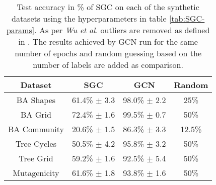 \begin{table}
    \centering
    \begin{tabular}{c|c|cc}
        \textbf{Dataset} & \textbf{SGC} & \textbf{GCN} & \textbf{Random} \\
        \midrule
        BA Shapes       & 61.4\% $\pm$ 3.3 & 98.0\% $\pm$ 2.2 & 25\% \\
        BA Grid         & 72.4\% $\pm$ 1.6 & 99.5\% $\pm$ 0.7 & 50\% \\
        BA Community    & 20.6\% $\pm$ 1.5 & 86.3\% $\pm$ 3.3 & 12.5\% \\
        Tree Cycles     & 50.5\% $\pm$ 4.2 & 95.8\% $\pm$ 3.2 & 50\% \\
        Tree Grid       & 59.2\% $\pm$ 1.6 & 92.5\% $\pm$ 5.4 & 50\% \\
        \midrule
        Mutagenicity    & 61.6\% $\pm$ 1.8 & 93.8\% $\pm$ 1.6 & 50\% \\
    \end{tabular}
    \caption{Test accuracy in \% of SGC on each of the synthetic datasets using the hyperparameters in table \ref{tab:SGC-params}. As per \textit{Wu et al.}\cite{wu2019simplifying} outliers are removed as defined in . The results achieved by GCN run for the same number of epochs and random guessing based on the number of labels are added as comparison.}
    \label{tab:SGC-acc}
\end{table}

